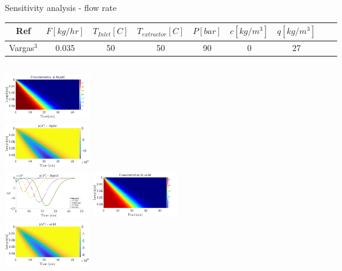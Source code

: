 \documentclass[8pt]{beamer}
\begin{document}
	\begin{frame}[fragile]{Sensitivity analysis - flow rate}
	\begin{table}[!hbt]
		\centering
		\begin{tabular}{ |c|c|c|c|c|c|c|c|c| } 
		\hline
		Ref& $F[kg/hr]$ & $T_{Inlet} [C]$ & $T_{extractor} [C]$ & $P [bar]$ & $c [kg/m^3]$ & $q [kg/m^3]$ \\ \hline
		Vargas$^3$ & 0.035      & 50              & 50		             & 90  	     & 0 		    & 27 		   \\ \hline
		\end{tabular}
	\end{table}				
	\begin{columns}[t]
		\centering
		\includegraphics[width=3.7cm,height=2.0cm]{Figures/Sensitivity/ConcentrationLiquid.png}\\
		\includegraphics[width=3.7cm,height=2.0cm]{Figures/Sensitivity/Imagesc/2_SS_R_F.png}\\
		\includegraphics[width=3.7cm,height=2.0cm]{Figures/Sensitivity/Plots/2_SS_R_F.png}
		\centering
		\includegraphics[width=3.7cm,height=2.05cm]{Figures/Sensitivity/ConcentrationSolid.png}\\
		\includegraphics[width=3.7cm,height=2.0cm]{Figures/Sensitivity/Imagesc/3_SS_R_F.png}\\

\end{columns}
\end{frame}
\end{document}
